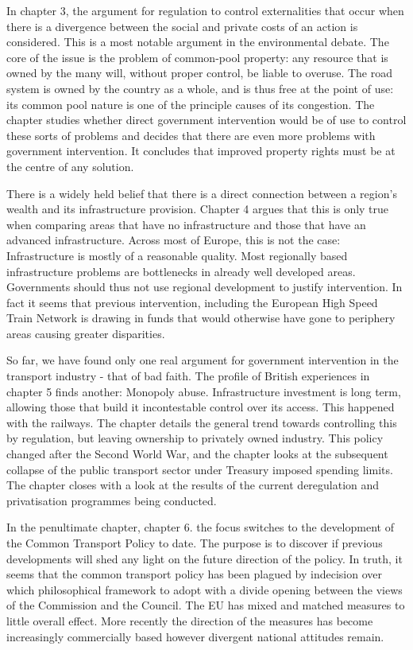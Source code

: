 In chapter 3, the argument for regulation to control externalities that occur when there is a divergence between the social and private costs of an action is considered. This is a most notable argument in the environmental debate. The core of the issue is the problem of common-pool property: any resource that is owned by the many will, without proper control, be liable to overuse. The road system is owned by the country as a whole, and is thus free at the point of use: its common pool nature is one of the principle causes of its congestion. The chapter studies whether direct government intervention would be of use to control these sorts of problems and decides that there are even more problems with government intervention. It concludes that improved property rights must be at the centre of any solution.

There is a widely held belief that there is a direct connection between a region's wealth and its infrastructure provision. Chapter 4 argues that this is only true when comparing areas that have no infrastructure and those that have an advanced infrastructure. Across most of Europe, this is not the case: Infrastructure is mostly of a reasonable quality. Most regionally based infrastructure problems are bottlenecks in already well developed areas. Governments should thus not use regional development to justify intervention. In fact it seems that previous intervention, including the European High Speed Train Network is drawing in funds that would otherwise have gone to periphery areas causing greater disparities.

So far, we have found only one real argument for government intervention in the transport industry - that of bad faith. The profile of British experiences in chapter 5 finds another: Monopoly abuse. Infrastructure investment is long term, allowing those that build it incontestable control over its access. This happened with the railways. The chapter details the general trend towards controlling this by regulation, but leaving ownership to privately owned industry. This policy changed after the Second World War, and the chapter looks at the subsequent collapse of the public transport sector under Treasury imposed spending limits. The chapter closes with a look at the results of the current deregulation and privatisation programmes being conducted.

In the penultimate chapter, chapter 6. the focus switches to the development of the Common Transport Policy to date. The purpose is to discover if previous developments will shed any light on the future direction of the policy. In truth, it seems that the common transport policy has been plagued by indecision over which philosophical framework to adopt with a divide opening between the views of the Commission and the Council. The EU has mixed and matched measures to little overall effect. More recently the direction of the measures has become increasingly commercially based however divergent national attitudes remain.


